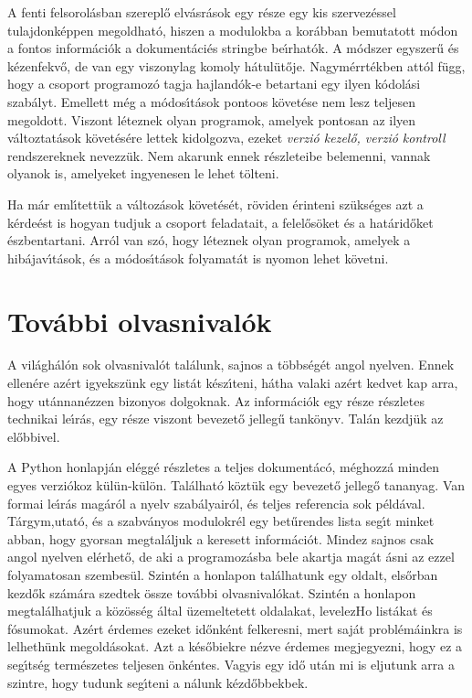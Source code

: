 \noindent A fenti felsorol\'asban szerepl\H{o} elv\'asr\'asok egy r\'esze egy kis szervez\'essel 
tulajdonk\'eppen megoldhat\'o, hiszen a modulokba a kor\'abban bemutatott m\'odon a fontos 
inform\'aci\'ok a dokument\'aci\'es stringbe be\'{\i}rhat\'ok. A m\'odszer egyszer\H{u} \'es 
k\'ezenfekv\H{o}, de van egy viszonylag komoly h\'atul\"ut\H{o}je. Nagym\'errt\'ekben att\'ol 
f\"ugg, hogy a csoport programoz\'o tagja hajland\'ok-e betartani egy ilyen k\'odol\'asi szab\'alyt. 
Emellett m\'eg a m\'odos\'{\i}t\'asok pontoos k\"ovet\'ese nem lesz teljesen megoldott. Viszont 
l\'eteznek olyan programok, amelyek pontosan az ilyen v\'altoztat\'asok k\"ovet\'es\'ere lettek 
kidolgozva, ezeket {\sl verzi\'o kezel\H{o}, verzi\'o kontroll} rendszereknek nevezz\"uk. 
 Nem akarunk ennek r\'eszleteibe belemenni, vannak olyanok is, amelyeket 
ingyenesen le lehet t\"olteni. 

Ha m\'ar eml\'{\i}tett\"uk a v\'altoz\'asok k\"ovet\'es\'et, r\"oviden \'erinteni sz\"uks\'eges azt a 
k\'erde\'est is hogyan tudjuk a csoport feladatait, a felel\H{o}s\"oket \'es a hat\'arid\H{o}ket 
\'eszbentartani. Arr\'ol van sz\'o, hogy l\'eteznek olyan programok, amelyek a hib\'ajav\'{\i}t\'asok, 
\'es a m\'odos\'{\i}t\'asok folyamat\'at is nyomon lehet k\"ovetni. 


\section{Tov\'abbi olvasnival\'ok}

A vil\'agh\'al\'on sok olvasnival\'ot tal\'alunk, sajnos a t\"obbs\'eg\'et angol nyelven. Ennek 
ellen\'ere az\'ert igyeksz\"unk egy list\'at k\'esz\'{\i}teni, h\'atha valaki az\'ert kedvet kap 
arra, hogy ut\'annan\'ezzen bizonyos dolgoknak. Az inform\'aci\'ok egy r\'esze r\'eszletes 
technikai le\'{\i}r\'as, egy r\'esze viszont bevezet\H{o} jelleg\H{u} tank\"onyv. Tal\'an 
kezdj\"uk az el\H{o}bbivel.

A Python honlapj\'an el\'egg\'e r\'eszletes a teljes dokument\'ac\'o, m\'eghozz\'a minden egyes 
verzi\'okoz k\"ul\"un-k\"ul\"on. Tal\'alhat\'o k\"ozt\"uk egy bevezet\H{o} jelleg\H{o} tananyag. 
Van formai le\'{\i}r\'as mag\'ar\'ol a nyelv szab\'alyair\'ol, \'es teljes referencia sok p\'eld\'aval. 
T\'argym,utat\'o, \'es a szabv\'anyos modulokr\'el egy bet\H{u}rendes lista seg\'{\i}t minket abban, 
hogy gyorsan megtal\'aljuk a keresett inform\'aci\'ot. Mindez sajnos csak angol nyelven el\'erhet\H{o}, 
de aki a programoz\'asba bele akartja mag\'at \'asni az ezzel folyamatosan szembes\"ul. Szint\'en 
a honlapon tal\'alhatunk egy oldalt, els\H{o}rban kezd\H{o}k sz\'am\'ara szedtek \"ossze tov\'abbi 
olvasnival\'okat. Szint\'en a honlapon megtal\'alhatjuk a k\"oz\"oss\'eg \'altal \"uzemeltetett 
oldalakat, levelezH{o} list\'akat \'es f\'osumokat. Az\'ert \'erdemes ezeket id\H{o}nk\'ent 
felkeresni, mert saj\'at probl\'em\'ainkra is lelheth\"unk megold\'asokat. Azt a k\'es\H{o}biekre 
n\'ezve \'erdemes megjegyezni, hogy ez a seg\'{\i}ts\'eg term\'eszetes teljesen \"onk\'entes. Vagyis 
egy id\H{o} ut\'an mi is eljutunk arra a szintre, hogy tudunk seg\'{\i}teni a n\'alunk k\'ezd\H{o}bbekbek. 

